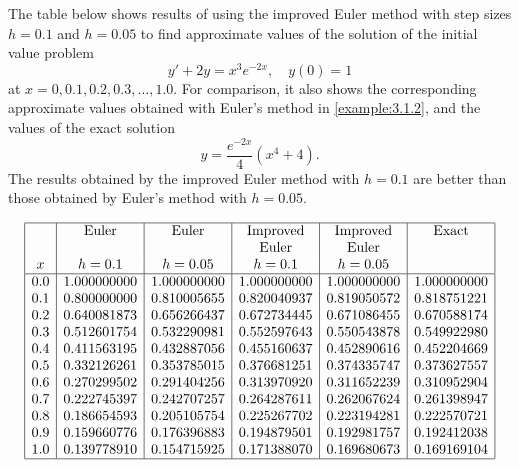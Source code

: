 \documentclass{ximera}
\begin{document}
\begin{example}\label{example:3.2.2}
The table below shows results of using the improved Euler method
with step sizes $h=0.1$ and $h=0.05$ to find approximate values of the
solution of the initial value problem
$$
y'+2y=x^3e^{-2x},\quad y(0)=1
$$
at $x=0, 0.1, 0.2, 0.3, \dots, 1.0$. For comparison, it also shows
the
corresponding approximate values obtained with Euler's method in
\ref{example:3.1.2}, and the values of the exact solution
$$
y=\frac{e^{-2x}}{4}(x^4+4).
$$
The results
obtained by the improved Euler method with $h=0.1$ are better than
those obtained by Euler's method with $h=0.05$.

$$
\begin{array}{|c|c|c|c|c|c|}
\hline
 &\text{Euler} &\text{Euler} &\text{Improved} &\text{Improved}& \text{Exact}\\
 & & &\text{Euler}&\text{Euler}& \\
x&h=0.1&h=0.05&h=0.1&h=0.05&
\\ \hline
0.0 & 1.000000000& 1.000000000& 1.000000000   &1.000000000 & 1.000000000 \\
0.1 & 0.800000000& 0.810005655& 0.820040937   &0.819050572 & 0.818751221 \\
0.2 & 0.640081873& 0.656266437& 0.672734445   &0.671086455 & 0.670588174 \\
0.3 & 0.512601754& 0.532290981& 0.552597643   &0.550543878 & 0.549922980 \\
0.4 & 0.411563195& 0.432887056& 0.455160637   &0.452890616 & 0.452204669 \\
0.5 & 0.332126261& 0.353785015& 0.376681251   &0.374335747 & 0.373627557 \\
0.6 & 0.270299502& 0.291404256& 0.313970920   &0.311652239 & 0.310952904 \\
0.7 & 0.222745397& 0.242707257& 0.264287611   &0.262067624 & 0.261398947 \\
0.8 & 0.186654593& 0.205105754& 0.225267702   &0.223194281 & 0.222570721 \\
0.9 & 0.159660776& 0.176396883& 0.194879501   &0.192981757 & 0.192412038 \\
1.0 & 0.139778910& 0.154715925& 0.171388070   &0.169680673 & 0.169169104\\
\hline
\end{array}
$$

\end{example}
\end{document}
